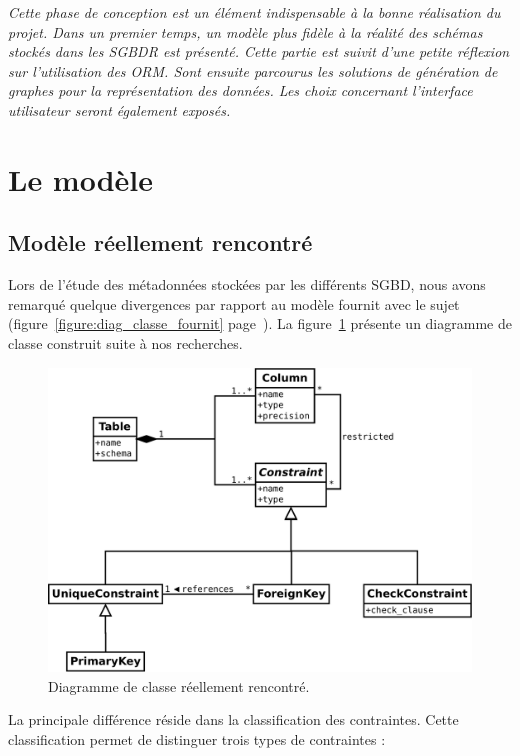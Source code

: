 \textit{Cette phase de conception est un élément indispensable à la bonne réalisation du projet. Dans un premier temps, un modèle plus fidèle à la réalité des schémas stockés dans les SGBDR est présenté. Cette partie est suivit d'une petite réflexion sur l'utilisation des ORM. Sont ensuite parcourus les solutions de génération de graphes pour la représentation des données. Les choix concernant l'interface utilisateur seront également exposés.}

\section{Le modèle}
\subsection{Modèle réellement rencontré}

Lors de l'étude des métadonnées stockées par les différents SGBD, nous avons remarqué quelque divergences par rapport au modèle fournit avec le sujet (figure~\ref{figure:diag_classe_fournit} page~\pageref{figure:diag_classe_fournit}). La figure~\ref{figure:diag_classe_reel} présente un diagramme de classe construit suite à nos recherches.

\begin{figure}[H]
\centering
\includegraphics[width=\textwidth]{files/diag_class_ameliore}
\caption{Diagramme de classe réellement rencontré.}
\label{figure:diag_classe_reel}
\end{figure}

La principale différence réside dans la classification des contraintes. Cette classification permet de distinguer trois types de contraintes :

